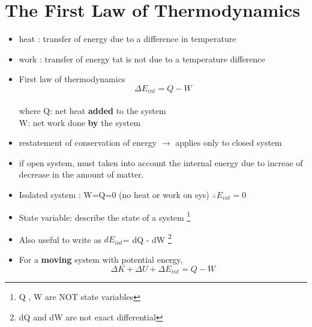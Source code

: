 \documentclass[12 pt , twoside, letterpaper] {article}
\begin{document}
\section{The First Law of Thermodynamics}
	\begin{itemize}
		\item heat : transfer of energy due to a difference in temperature
 		\item work : transfer of energy tat is not due to a temperature difference
 		\item First law of thermodynamics 
 				\begin{equation}
					\Delta E_{int} = Q - W		
				\end{equation}				 		
 		\\where Q: net heat \textbf{added} to the system
 		\\ W: net work done \textbf{by} the system
 		\item restatement of conservation of energy $\rightarrow$ applies only to closed system
 		\item if open system, must taken into account the internal energy due to increae of decrease in the amount of matter.
 		\item Isolated system : W=Q=0 (no heat or work on sys) $\therefore E_{int}=0$
 		\item State variable: describe the state of a system 
 			\footnote{Q , W are NOT state variables}
 		\item Also useful to write as $dE_{int} $= dQ - dW
 			\footnote{dQ and dW are not exact differential}
 		\item For a \textbf{moving} system with potential energy,
 		\begin{equation}
 		\Delta K + \Delta U +\Delta E_{int}=Q - W
 		\end{equation}
	\end{itemize}
\end{document}
